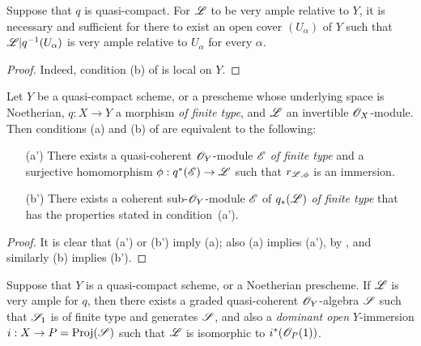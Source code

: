 \begin{corollary}[4.4.5]
\label{II.4.4.5}
Suppose that $q$ is quasi-compact.
For $\mathscr{L}$ to be very ample relative to $Y$, it is necessary and sufficient for there to exist an open cover $(U_\alpha)$ of $Y$ such that $\mathscr{L}|q^{-1}(U_\alpha)$ is very ample relative to $U_\alpha$ for every $\alpha$.
\end{corollary}

\begin{proof}
Indeed, condition (b) of  is local on $Y$.
\end{proof}

\begin{proposition}[4.4.6]
\label{II.4.4.6}
Let $Y$ be a quasi-compact scheme, or a prescheme whose underlying space is Noetherian, $q:X\to Y$ a morphism \emph{of finite type}, and $\mathscr{L}$ an invertible $\mathscr{O}_X$-module.
Then conditions (a) and (b) of  are equivalent to the following:
\begin{enumerate}
  \item[\rm{(a')}] There exists a quasi-coherent $\mathscr{O}_Y$-module $\mathscr{E}$ \emph{of finite type} and a surjective homomorphism $\vphi:q^*(\sh{E})\to\sh{L}$ such that $r_{\mathscr{L},\phi}$ is an immersion.
  \item[\rm{(b')}] There exists a coherent sub-$\mathscr{O}_Y$-module $\mathscr{E}$ of $q_*(\mathscr{L})$ \emph{of finite type} that has the properties stated in condition~(a').
\end{enumerate}
\end{proposition}

\begin{proof}
It is clear that (a') or (b') imply (a);
also (a) implies (a'), by , and similarly (b) implies (b').
\end{proof}

\begin{corollary}[4.4.7]
\label{II.4.4.7}
Suppose that $Y$ is a quasi-compact scheme, or a Noetherian prescheme.
If $\mathscr{L}$ is very ample for $q$, then there exists a graded quasi-coherent $\mathscr{O}_Y$-algebra $\mathscr{S}$ such that $\mathscr{S}_1$ is of finite type and generates $\mathscr{S}$, and also a \emph{dominant open} $Y$-immersion $i:X\to P=\Proj(\sh{S})$ such that $\mathscr{L}$ is isomorphic to $i^*(\mathscr{O}_P(1))$.
\end{corollary}

